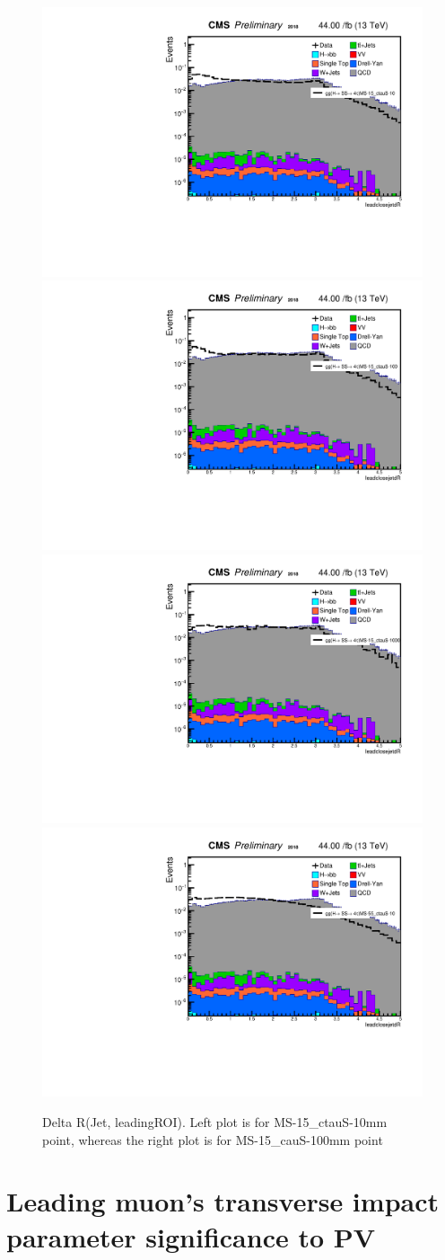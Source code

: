  \begin{figure}[h!]
   \label{fig:JetDeltaRleadSize}
   \centering
   \includegraphics[width=0.47\linewidth]{figs/log_Oct6ANVars_MS-15_ctauS-10_leadcloseJetdR.pdf}
   \includegraphics[width=0.47\linewidth]{figs/log_Oct6ANVars_MS-15_ctauS-100_leadcloseJetdR.pdf}
   \includegraphics[width=0.47\linewidth]{figs/log_Oct6ANVars_MS-15_ctauS-1000_leadcloseJetdR.pdf}
   \includegraphics[width=0.47\linewidth]{figs/log_Oct6ANVars_MS-55_ctauS-10_leadcloseJetdR.pdf}
   \caption{Delta R(Jet, leadingROI). Left plot is for MS-15\_ctauS-10mm point, whereas the right plot is for MS-15\_cauS-100mm point}
 \end{figure}

\section{Leading muon's transverse impact parameter significance to PV}\label{ref:muIP}

